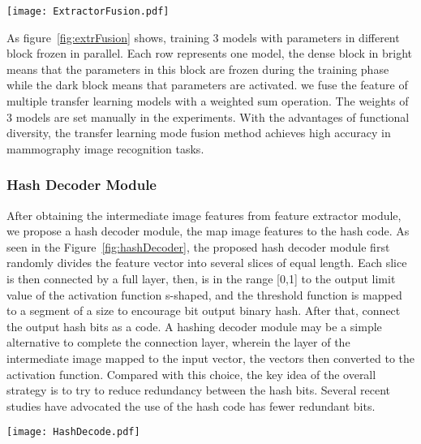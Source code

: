 \begin{figure*}[!ht]
    \centering
    \texttt{[image: ExtractorFusion.pdf]}
    \caption{The module of feature through such steps, the model can not 
    only improve the generalization ability of the 
    model, but also simplify the calculation of 
    high-dimensional features to facilitate the work 
    of the classifier extractors' fusion.}
    \label{fig:extrFusion}
\end{figure*} 

As figure~\ref{fig:extrFusion}
shows, training 3 models with parameters in 
different block frozen in parallel. 
Each row represents one model, the dense block 
in bright means that the parameters in this 
block are frozen during the training phase 
while the dark block means that parameters 
are activated.
we fuse the feature of multiple transfer 
learning models with a weighted sum operation. 
The weights of 3 models are set manually in 
the experiments. 
With the advantages of functional diversity, 
the transfer learning mode fusion method 
achieves high accuracy in mammography 
image recognition tasks.


\subsubsection{Hash Decoder Module}
\label{sec:MethNetHash}

After obtaining the intermediate image 
features from feature extractor module, 
we propose a hash decoder module, the map 
image features to the hash code.
As seen in the Figure~\ref{fig:hashDecoder}, 
the proposed hash decoder module first randomly 
divides the feature vector into several slices 
of equal length\cite{Lai2015}.
Each slice is then connected by a full layer, 
then, is in the range [0,1] to the output limit 
value of the activation function s-shaped, and 
the threshold function is mapped to a segment 
of a size to encourage bit output binary hash.
After that, connect the output hash bits as a
code.
A hashing decoder module may be a simple 
alternative to complete the connection layer, 
wherein the layer of the intermediate image 
mapped to the input vector, the vectors then 
converted to the activation function.
Compared with this choice, the key idea of the 
overall strategy is to try to reduce redundancy 
between the hash bits.
Several recent studies have advocated the use 
of the hash code has fewer redundant bits.

\begin{figure*}[!ht]
    \centering
    \texttt{[image: HashDecode.pdf]}
    \caption{The module of the hash decoder.}
    \label{fig:hashDecoder}
\end{figure*} 

